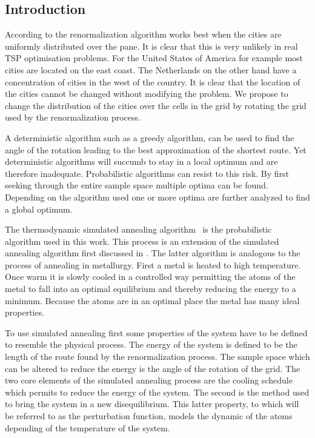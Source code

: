 \subsection{Introduction}
According to \cite{yoshiyuki1995nms} the renormalization algorithm works best
when the cities are uniformly distributed over the pane. It is clear that this
is very unlikely in real TSP optimisation problems. For the United States of
America for example most cities are located on the east coast. The Netherlands
on the other hand have a concentration of cities in the west of the country.
It is clear that the location of the cities cannot be changed without
modifying the problem. We propose to change the distribution of the cities
over the cells in the grid by rotating the grid used by the renormalization
process.

A deterministic algorithm such as a greedy algorithm, can be used to find the
angle of the rotation leading to the best approximation of the shortest route. Yet
deterministic algorithms will succumb to stay in a local optimum and are
therefore inadequate. Probabilistic algorithms can resist to this risk. By
first seeking through the entire sample space multiple optima can be found.
Depending on the algorithm used one or more optima are further analyzed to
find a global optimum.

The thermodynamic simulated annealing algorithm \cite{devicente2003pts}~is the
probabilistic algorithm used in this work. This process is an extension of the
simulated annealing algorithm first discussed in \cite{kirkpatrick83}. The
latter algorithm is analogous to the process of annealing in metallurgy. First
a metal is heated to high temperature. Once warm it is slowly cooled in a
controlled way permitting the atoms of the metal to fall into an optimal
equilibrium and thereby reducing the energy to a minimum. Because the atoms
are in an optimal place the metal has many ideal properties. 

To use simulated annealing first some properties of the system have to be
defined to resemble the physical process. The energy of the system is defined
to be the length of the route found by the renormalization process. The sample
space which can be altered to reduce the energy is the angle of the rotation of the grid.
The two core elements of the simulated annealing process are the cooling
schedule which permits to reduce the energy of the system. The second is the
method used to bring the system in a new disequilibrium. This latter property,
to which will be referred to as the perturbation function, models the dynamic of
the atoms depending of the temperature of the system.

